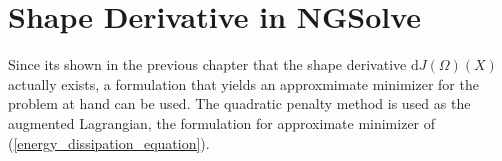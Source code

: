 
\section{Shape Derivative in NGSolve}
Since its shown in the previous chapter that the shape derivative $\mathrm{d}J(\Omega)(X)$ actually exists, a formulation
that yields an approxmimate minimizer for the problem at hand can be used. The quadratic penalty method is used 
as the augmented Lagrangian, the formulation for approximate minimizer of (\ref*{energy_dissipation_equation}).
